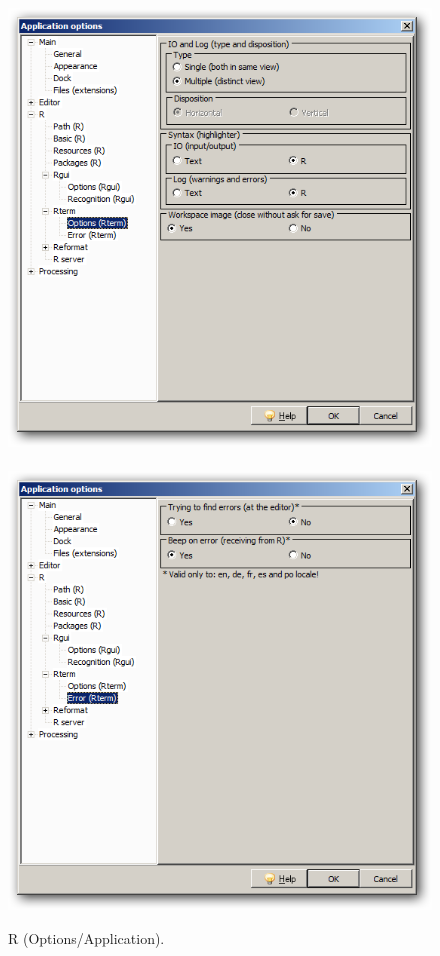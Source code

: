 \begin{figure}[h!]
  \includegraphics[scale=0.35]{./res/app_r_rterm_options.png}~~
  \includegraphics[scale=0.35]{./res/app_r_rterm_error.png}\\
  \caption{R (Options/Application).}
  \label{fig:app_r_b}
\end{figure}


